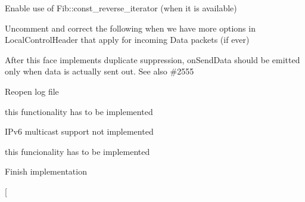 \begin{DoxyRefList}
\item[\label{todo__todo000022}%
\hypertarget{todo__todo000022}{}%
Member \hyperlink{classnfd_1_1FibEnumerationPublisher_a87c8cf23bcaa9f19d98fbf9e3c641a66}{nfd\+:\+:Fib\+Enumeration\+Publisher\+:\+:generate} (ndn\+::\+Encoding\+Buffer \&out\+Buffer)]Enable use of Fib\+::const\+\_\+reverse\+\_\+iterator (when it is available)  
\item[\label{todo__todo000017}%
\hypertarget{todo__todo000017}{}%
Member \hyperlink{classnfd_1_1LocalFace_acc0605a77317fd364ac2e1d05a1535b0}{nfd\+:\+:Local\+Face\+:\+:decode\+And\+Dispatch\+Input} (const Block \&element)]Uncomment and correct the following when we have more options in Local\+Control\+Header that apply for incoming Data packets (if ever)  
\item[\label{todo__todo000018}%
\hypertarget{todo__todo000018}{}%
Member \hyperlink{classnfd_1_1MulticastUdpFace_a26ba1a0b0ee6ce18fadebbbf9222ff32}{nfd\+:\+:Multicast\+Udp\+Face\+:\+:send\+Data} (const Data \&data) D\+E\+C\+L\+\_\+\+O\+V\+E\+R\+R\+I\+DE]After this face implements duplicate suppression, on\+Send\+Data should be emitted only when data is actually sent out. See also \#2555  
\item[\label{todo__todo000023}%
\hypertarget{todo__todo000023}{}%
Member \hyperlink{classnfd_1_1Nfd_a3c4b08b8ebf1711d032a64a3a7e89226}{nfd\+:\+:Nfd\+:\+:reload\+Config\+File} ()]Reopen log file  
\item[\label{todo__todo000019}%
\hypertarget{todo__todo000019}{}%
Member \hyperlink{classnfd_1_1UdpChannel_aa6007aac664051294f7739004d09f2ab}{nfd\+:\+:Udp\+Channel\+:\+:listen} (const Face\+Created\+Callback \&on\+Face\+Created, const Connect\+Failed\+Callback \&on\+Receive\+Failed)]this functionality has to be implemented 
\item[\label{todo__todo000020}%
\hypertarget{todo__todo000020}{}%
Class \hyperlink{classnfd_1_1UdpFactory}{nfd\+:\+:Udp\+Factory} ]I\+Pv6 multicast support not implemented  
\item[\label{todo__todo000021}%
\hypertarget{todo__todo000021}{}%
Member \hyperlink{classnfd_1_1UdpFactory_a9bad75ed0f68f1802599fbd98c4edebc}{nfd\+:\+:Udp\+Factory\+:\+:create\+Channel} (const udp\+::\+Endpoint \&local\+Endpoint, const time\+::seconds \&timeout=time\+::seconds(600))]this funcionality has to be implemented 
\item[\label{todo__todo000048}%
\hypertarget{todo__todo000048}{}%
Class \hyperlink{classns3_1_1L2RateTracer}{ns3\+:\+:L2\+Rate\+Tracer} ]Finish implementation  
\item[\label{todo__todo000049}%

\end{DoxyRefList}
